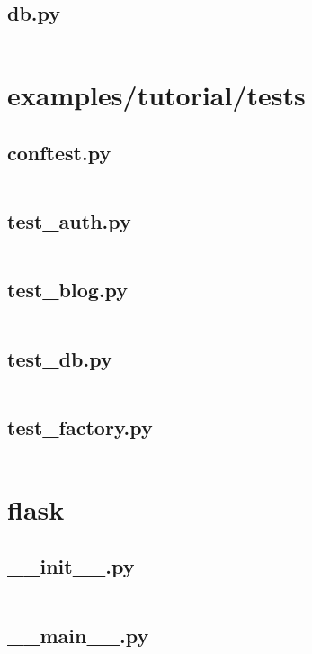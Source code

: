 \documentclass{article}
\begin{document}
\subsection{db.py}
\inputminted{python}{/tmp/flask/examples/tutorial/flaskr/db.py}
\newpage

\section{examples/tutorial/tests}

\subsection{conftest.py}
\inputminted{python}{/tmp/flask/examples/tutorial/tests/conftest.py}
\newpage

\subsection{test\_auth.py}
\inputminted{python}{/tmp/flask/examples/tutorial/tests/test_auth.py}
\newpage

\subsection{test\_blog.py}
\inputminted{python}{/tmp/flask/examples/tutorial/tests/test_blog.py}
\newpage

\subsection{test\_db.py}
\inputminted{python}{/tmp/flask/examples/tutorial/tests/test_db.py}
\newpage

\subsection{test\_factory.py}
\inputminted{python}{/tmp/flask/examples/tutorial/tests/test_factory.py}
\newpage

\section{flask}

\subsection{\_\_init\_\_.py}
\inputminted{python}{/tmp/flask/flask/__init__.py}
\newpage

\subsection{\_\_main\_\_.py}
\inputminted{python}{/tmp/flask/flask/__main__.py}
\newpage
\end{document}

